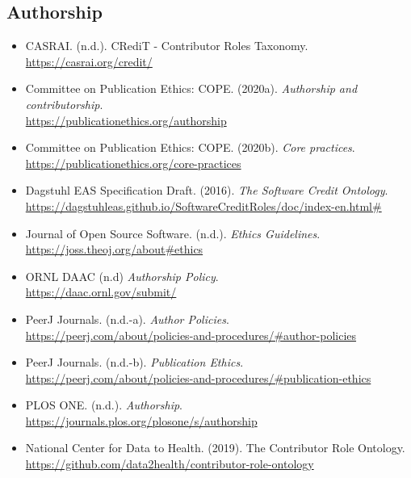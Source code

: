 \documentclass[11pt]{article}
\begin{document}
\vspace*{-2pt}
\subsection{Authorship}
\label{authorship}

\begin{itemize}

\item CASRAI. (n.d.). CRediT - Contributor Roles Taxonomy.\\
\url{https://casrai.org/credit/}

\item Committee on Publication Ethics: COPE. (2020a). \emph{Authorship and contributorship}.\\
\url{https://publicationethics.org/authorship}

\item Committee on Publication Ethics: COPE. (2020b). \emph{Core practices}.\\
\url{https://publicationethics.org/core-practices}

\item Dagstuhl EAS Specification Draft. (2016). \emph{The Software Credit Ontology}.\\
\url{https://dagstuhleas.github.io/SoftwareCreditRoles/doc/index-en.html\#}

\item Journal of Open Source Software. (n.d.). \emph{Ethics Guidelines}.\\
\url{https://joss.theoj.org/about\#ethics}

\item ORNL DAAC (n.d) \emph{Authorship Policy}.\\
\url{https://daac.ornl.gov/submit/}

\item PeerJ Journals. (n.d.-a). \emph{Author Policies}.\\
\url{https://peerj.com/about/policies-and-procedures/\#author-policies}

\item PeerJ Journals. (n.d.-b). \emph{Publication Ethics}.\\
\url{https://peerj.com/about/policies-and-procedures/\#publication-ethics}

\item PLOS ONE. (n.d.). \emph{Authorship}.\\
\url{https://journals.plos.org/plosone/s/authorship}

\item National Center for Data to Health. (2019). The Contributor Role Ontology.\\ 
\url{https://github.com/data2health/contributor-role-ontology}

\end{itemize}
\end{document}
